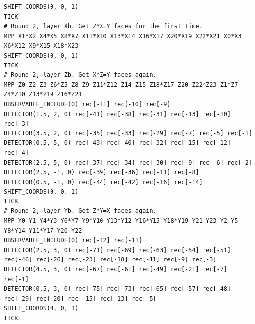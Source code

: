 \documentclass[onecolumn,a4paper,accepted=2022-09-12]{quantumarticle}
\theoremstyle{definition}
\theoremstyle{definition}
\theoremstyle{definition}
\begin{document}
\begin{lstlisting}[style=stimcircuit]
SHIFT_COORDS(0, 0, 1)
TICK
# Round 2, layer Xb. Get Z*X=Y faces for the first time.
MPP X1*X2 X4*X5 X8*X7 X11*X10 X13*X14 X16*X17 X20*X19 X22*X21 X0*X3 X6*X12 X9*X15 X18*X23
SHIFT_COORDS(0, 0, 1)
TICK
# Round 2, layer Zb. Get X*Z=Y faces again.
MPP Z0 Z2 Z3 Z6*Z5 Z8 Z9 Z11*Z12 Z14 Z15 Z18*Z17 Z20 Z22*Z23 Z1*Z7 Z4*Z10 Z13*Z19 Z16*Z21
OBSERVABLE_INCLUDE(0) rec[-11] rec[-10] rec[-9]
DETECTOR(1.5, 2, 0) rec[-41] rec[-38] rec[-31] rec[-13] rec[-10] rec[-3]
DETECTOR(3.5, 2, 0) rec[-35] rec[-33] rec[-29] rec[-7] rec[-5] rec[-1]
DETECTOR(0.5, 5, 0) rec[-43] rec[-40] rec[-32] rec[-15] rec[-12] rec[-4]
DETECTOR(2.5, 5, 0) rec[-37] rec[-34] rec[-30] rec[-9] rec[-6] rec[-2]
DETECTOR(2.5, -1, 0) rec[-39] rec[-36] rec[-11] rec[-8]
DETECTOR(0.5, -1, 0) rec[-44] rec[-42] rec[-16] rec[-14]
SHIFT_COORDS(0, 0, 1)
TICK
# Round 2, layer Yb. Get Z*Y=X faces again.
MPP Y0 Y1 Y4*Y3 Y6*Y7 Y9*Y10 Y13*Y12 Y16*Y15 Y18*Y19 Y21 Y23 Y2 Y5 Y8*Y14 Y11*Y17 Y20 Y22
OBSERVABLE_INCLUDE(0) rec[-12] rec[-11]
DETECTOR(2.5, 3, 0) rec[-71] rec[-69] rec[-63] rec[-54] rec[-51] rec[-46] rec[-26] rec[-23] rec[-18] rec[-11] rec[-9] rec[-3]
DETECTOR(4.5, 3, 0) rec[-67] rec[-61] rec[-49] rec[-21] rec[-7] rec[-1]
DETECTOR(0.5, 3, 0) rec[-75] rec[-73] rec[-65] rec[-57] rec[-48] rec[-29] rec[-20] rec[-15] rec[-13] rec[-5]
SHIFT_COORDS(0, 0, 1)
TICK


\end{lstlisting}
\end{document}
